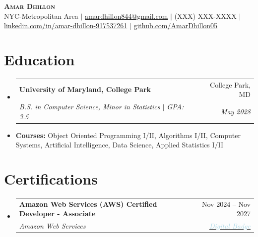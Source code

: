 \documentclass[letterpaper,10pt]{extarticle}
\makeatletter
\newcommand{\resumeItem}[1]{\item\footnotesize{#1\vspace{-2pt}}}
\newcommand{\resumeSubheading}[4]{%
  \vspace{-2pt}\item
  \begin{tabular*}{0.97\textwidth}[t]{l@{\extracolsep{\fill}}r}
    \textbf{\small#1} & \small#2 \\
    \textit{\small#3} & \textit{\small #4} \\
  \end{tabular*}\vspace{-7pt}%
}
\newcommand{\resumeSubHeadingListStart}{\begin{itemize}[leftmargin=0.15in, label={}]}
\newcommand{\resumeSubHeadingListEnd}{\end{itemize}}
\newcommand{\resumeItemListStart}{\begin{itemize}}
\newcommand{\resumeItemListEnd}{\end{itemize}\vspace{-5pt}}
\makeatother
\begin{document}
\fontsize{8.5pt}{10pt}\selectfont




\begin{center}
    \textcolor{myblue}{\textbf{\fontsize{22}{26}\selectfont \scshape Amar Dhillon}} \\ \vspace{1pt}
    \footnotesize
    NYC-Metropolitan Area $|$
    \href{mailto:amardhillon844@gmail.com}{\underline{amardhillon844@gmail.com}} $|$
    (XXX) XXX-XXXX $|$
    \href{https://linkedin.com/in/amar-dhillon-917537261}{\underline{linkedin.com/in/amar-dhillon-917537261}} $|$
    \href{https://github.com/AmarDhillon05}{\underline{github.com/AmarDhillon05}}
\end{center}


\section{Education}
\vspace{3pt}
  \resumeSubHeadingListStart
    \resumeSubheading
      {University of Maryland, College Park}{College Park, MD}
      {B.S. in Computer Science, Minor in Statistics $|$ GPA: 3.5}{May 2028}
        \resumeItem{\textbf{Courses:} Object Oriented Programming I/II, Algorithms I/II, Computer Systems, Artificial Intelligence, Data Science, Applied Statistics I/II}
  \resumeSubHeadingListEnd


\section{Certifications}
\vspace{3pt}
\resumeSubHeadingListStart
  \resumeSubheading
    {Amazon Web Services (AWS) Certified Developer - Associate}{Nov 2024 -- Nov 2027}
    {Amazon Web Services}{{\href{https://www.credly.com/badges/d2406a97-d937-47de-823b-724981159d3b/public_url}
{\textcolor{lightblue}{Digital Badge}}}}
\resumeSubHeadingListEnd
\end{document}
